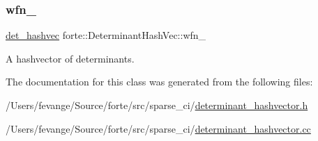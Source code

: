 \subsubsection{\texorpdfstring{wfn\+\_\+}{wfn\_}}
{\footnotesize\ttfamily \mbox{\hyperlink{namespaceforte_aee00ff2f656f0aa613d3f9f1ba01cad5}{det\+\_\+hashvec}} forte\+::\+Determinant\+Hash\+Vec\+::wfn\+\_\+\hspace{0.3cm}{\ttfamily [protected]}}



A hashvector of determinants. 



The documentation for this class was generated from the following files\+:\begin{DoxyCompactItemize}
\item 
/\+Users/fevange/\+Source/forte/src/sparse\+\_\+ci/\mbox{\hyperlink{determinant__hashvector_8h}{determinant\+\_\+hashvector.\+h}}\item 
/\+Users/fevange/\+Source/forte/src/sparse\+\_\+ci/\mbox{\hyperlink{determinant__hashvector_8cc}{determinant\+\_\+hashvector.\+cc}}\end{DoxyCompactItemize}
